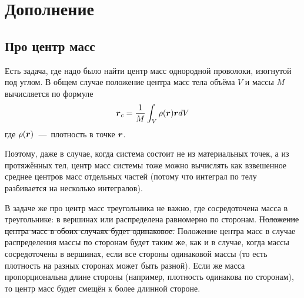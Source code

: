 \documentclass[a4paper,12pt]{article}
\begin{document}
  
  \section{Дополнение}
  
  \subsection{Про центр масс}
  
  Есть задача, где надо было найти центр масс однородной проволоки, изогнутой под углом.
  В общем случае положение центра масс тела объёма $V$ и массы $M$ вычисляется по формуле
  \[
    \boldsymbol r_c = \frac{1}{M} \int_V \rho(\boldsymbol r) \boldsymbol r dV
  \]
  где $\rho(\boldsymbol r)$~---~плотность в точке $\boldsymbol r$.
  
  Поэтому, даже в случае, когда система состоит не из материальных точек, а из протяжённых тел, центр масс системы тоже можно вычислять как взвешенное среднее центров масс отдельных частей (потому что интеграл по телу разбивается на несколько интегралов).
  
  В задаче же про центр масс треугольника не важно, где сосредоточена масса в треугольнике: в вершинах или распределена равномерно по сторонам.
  \sout{Положение центра масс в обоих случаях будет одинаковое.}
  Положение центра масс в случае распределения массы по сторонам будет таким же, как и в случае, когда массы сосредоточены в вершинах, если все стороны одинаковой массы (то есть плотность на разных сторонах может быть разной).
  Если же масса пропорциональна длине стороны (например, плотность одинакова по сторонам), то центр масс будет смещён к более длинной стороне.
\end{document}
